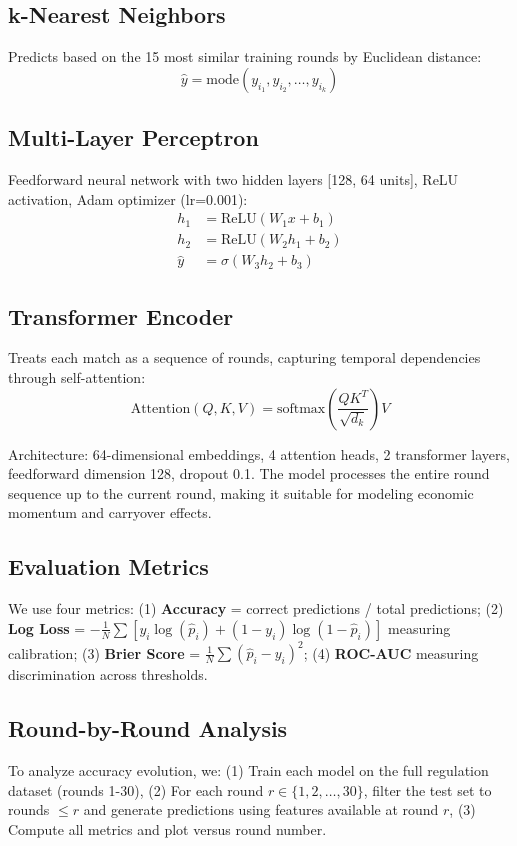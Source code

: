 \documentclass[10pt,twocolumn]{article}
\begin{document}
\subsection{k-Nearest Neighbors}
Predicts based on the 15 most similar training rounds by Euclidean distance:
\begin{equation}
\hat{y} = \text{mode}(y_{i_1}, y_{i_2}, \ldots, y_{i_k})
\end{equation}

\subsection{Multi-Layer Perceptron}
Feedforward neural network with two hidden layers [128, 64 units], ReLU activation, Adam optimizer (lr=0.001):
\begin{align}
h_1 &= \text{ReLU}(W_1 x + b_1) \\
h_2 &= \text{ReLU}(W_2 h_1 + b_2) \\
\hat{y} &= \sigma(W_3 h_2 + b_3)
\end{align}

\subsection{Transformer Encoder}
Treats each match as a sequence of rounds, capturing temporal dependencies through self-attention:
\begin{equation}
\text{Attention}(Q,K,V) = \text{softmax}\left(\frac{QK^T}{\sqrt{d_k}}\right)V
\end{equation}

Architecture: 64-dimensional embeddings, 4 attention heads, 2 transformer layers, feedforward dimension 128, dropout 0.1. The model processes the entire round sequence up to the current round, making it suitable for modeling economic momentum and carryover effects.

\subsection{Evaluation Metrics}
We use four metrics: (1) \textbf{Accuracy} = correct predictions / total predictions; (2) \textbf{Log Loss} = $-\frac{1}{N}\sum[y_i\log(\hat{p}_i) + (1-y_i)\log(1-\hat{p}_i)]$ measuring calibration; (3) \textbf{Brier Score} = $\frac{1}{N}\sum(\hat{p}_i - y_i)^2$; (4) \textbf{ROC-AUC} measuring discrimination across thresholds.

\subsection{Round-by-Round Analysis}
To analyze accuracy evolution, we: (1) Train each model on the full regulation dataset (rounds 1-30), (2) For each round $r \in \{1,2,\ldots,30\}$, filter the test set to rounds $\leq r$ and generate predictions using features available at round $r$, (3) Compute all metrics and plot versus round number.
\end{document}

